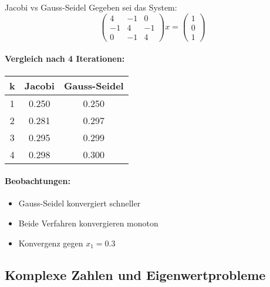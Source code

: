 \begin{example2}{Jacobi vs Gauss-Seidel}
Gegeben sei das System:
$$\begin{pmatrix}
4 & -1 & 0 \\
-1 & 4 & -1 \\
0 & -1 & 4
\end{pmatrix} x = \begin{pmatrix}
1 \\
0 \\
1
\end{pmatrix}$$

\paragraph{Vergleich nach 4 Iterationen:}
\begin{center}
\begin{tabular}{c|cc}
k & Jacobi & Gauss-Seidel \\\hline
1 & 0.250 & 0.250 \\
2 & 0.281 & 0.297 \\
3 & 0.295 & 0.299 \\
4 & 0.298 & 0.300
\end{tabular}
\end{center}

\paragraph{Beobachtungen:}
\begin{itemize}
    \item Gauss-Seidel konvergiert schneller
    \item Beide Verfahren konvergieren monoton
    \item Konvergenz gegen $x_1 = 0.3$
\end{itemize}
\end{example2}

\subsection{Komplexe Zahlen und Eigenwertprobleme}

